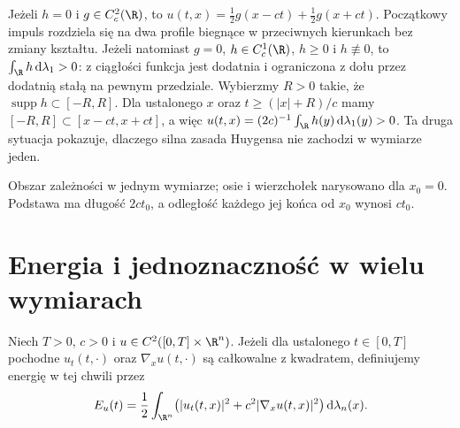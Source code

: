 \begin{przyklad}
Jeżeli $h=0$ i $g\in C_c^2(\R)$, to
$u(t,x)=\frac12g(x-ct)+\frac12g(x+ct)$.
Początkowy impuls rozdziela się na dwa profile
biegnące w przeciwnych kierunkach bez zmiany kształtu.
Jeżeli natomiast $g=0$, $h\in C_c^1(\R)$,
$h\geq0$ i $h\not\equiv0$, to $\int_\R h\,\mathrm d\lambda_1>0$:
z ciągłości funkcja jest dodatnia i ograniczona
z dołu przez dodatnią stałą na pewnym przedziale.
Wybierzmy $R>0$ takie, że $\operatorname{supp}h\subset[-R,R]$.
Dla ustalonego $x$ oraz $t\geq(|x|+R)/c$ mamy
$[-R,R]\subset[x-ct,x+ct]$, a więc
$u(t,x)=(2c)^{-1}\int_\R h(y)\,\mathrm d\lambda_1(y)>0$.
Ta druga sytuacja pokazuje, dlaczego silna zasada
Huygensa nie zachodzi w wymiarze jeden.
\end{przyklad}

\begin{center}
\begin{minipage}{\linewidth}
\centering
{}
\par\smallskip\small
Obszar zależności w jednym wymiarze; osie i wierzchołek
narysowano dla $x_0=0$. Podstawa ma długość $2ct_0$,
a odległość każdego jej końca od $x_0$ wynosi $ct_0$.
\end{minipage}
\end{center}

\section{Energia i jednoznaczność w wielu wymiarach}
\label{sec:pde5-energy}

\begin{definicja}
Niech $T>0$, $c>0$ i $u\in C^2([0,T]\times\R^n)$.
Jeżeli dla ustalonego $t\in[0,T]$ pochodne
$u_t(t,\cdot)$ oraz $\nabla_xu(t,\cdot)$ są
całkowalne z kwadratem, definiujemy energię
w tej chwili przez
\begin{equation}\label{eq:pde5-energy}
 E_u(t)=\frac12\int_{\R^n}
 \bigl(|u_t(t,x)|^2+c^2|\nabla_xu(t,x)|^2\bigr)
 \,\mathrm d\lambda_n(x).
\end{equation}
\end{definicja}

